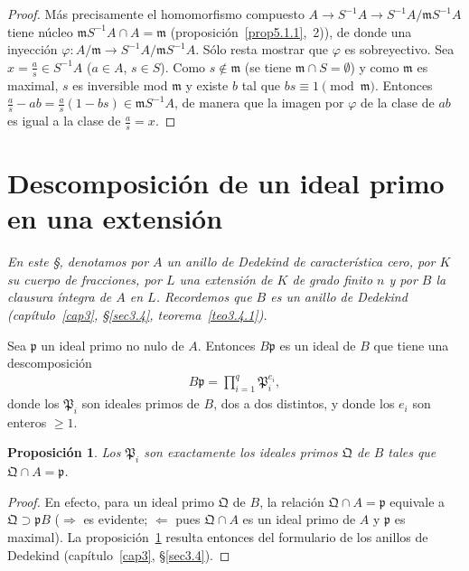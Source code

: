 \documentclass[oneside,bibtotoc,leqno,spanish]{amsbook}
\newcommand{\idl}[1]{\mathfrak{#1}}
\newcommand{\QED}{}%
\renewcommand{\to}[1][]{\xrightarrow{#1}}
\numberwithin{equation}{section}
\theoremstyle{defi}
\theoremstyle{note}
\newtheorem{proposition}{Proposici\'on}
\theoremstyle{rem}
\numberwithin{theorem}{section}
\numberwithin{proposition}{section}
\numberwithin{definition}{section}
\numberwithin{lemma}{section}
\numberwithin{corollary}{section}
\numberwithin{example}{section}
\numberwithin{footnote}{section}%
\begin{document}
\begin{proof}
M\'as precisamente el homomorfismo compuesto $A\to S^{-1}A\to S^{-1}A/\idl{m}S^{-1}A$ tiene n\'ucleo
$\idl{m}S^{-1}A\cap A=\idl{m}$ (proposici\'on~\ref{prop5.1.1},~2)),
de donde una inyecci\'on $\varphi:A/\idl{m}\to S^{-1}A/\idl{m}S^{-1}A$.
S\'olo resta mostrar que $\varphi$ es sobreyectivo. Sea $x = \frac{a}{s}\in S^{-1}A$ ($a\in A$, $s\in S$). Como
$s\notin\idl{m}$ (se tiene $\idl{m}\cap S=\emptyset$) y como $\idl{m}$ es maximal, $s$ es inversible mod $\idl{m}$
y existe $b$ tal que $bs\equiv 1\pmod\idl{m}$. Entonces $\frac{a}{s}-ab=\frac{a}{s}(1-bs)\in\idl{m}S^{-1}A$,
de manera que la imagen por $\varphi$ de la clase de $ab$ es igual a la clase de $\frac{a}{s} = x$. \QED
\end{proof}

\section{Descomposici\'on de un ideal primo en una extensi\'on}\label{sec5.2}

\begin{trivlist}
\item\textit{En este \S, denotamos por $A$ un anillo de Dedekind de caracter\'istica cero, por $K$ su cuerpo
de fracciones, por $L$ una extensi\'on de $K$ de grado finito $n$ y por $B$ la clausura \'integra de $A$ en $L$.
Recordemos que $B$ es un anillo de Dedekind (cap\'itulo~\ref{cap3}, \S\ref{sec3.4}, teorema~\ref{teo3.4.1}).}
\end{trivlist}

Sea $\idl{p}$ un ideal primo no nulo de $A$. Entonces $B\idl{p}$ es un ideal de $B$ que tiene una descomposici\'on
\begin{gather}\label{eq-5.2-1}
B\idl{p} = \prod_{i=1}^{q}\idl{P}_{i}^{e_{i}},
\end{gather}
donde los $\idl{P}_{i}$ son ideales primos de $B$, dos a dos distintos, y donde los $e_{i}$ son enteros $\geq 1$.

\begin{proposition}\label{prop5.2.1}
Los $\idl{P}_{i}$ son exactamente los ideales primos $\idl{Q}$ de $B$ tales que $\idl{Q}\cap A=\idl{p}$.
\end{proposition}

\begin{proof}
En efecto, para un ideal primo $\idl{Q}$ de $B$, la relaci\'on $\idl{Q}\cap A=\idl{p}$ equivale a
$\idl{Q}\supset\idl{p}B$ ($\Rightarrow$ es evidente; $\Leftarrow$ pues $\idl{Q}\cap A$ es un ideal primo de
$A$ y $\idl{p}$ es maximal). La proposici\'on~\ref{prop5.2.1} resulta entonces del formulario de los anillos de Dedekind
(cap\'itulo~\ref{cap3}, \S\ref{sec3.4}).
\end{proof}
\end{document}
